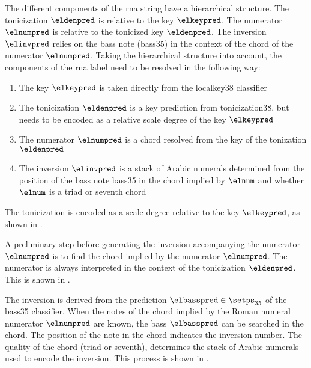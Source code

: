 
The different components of the \gls{rna} string have a
hierarchical structure. The tonicization $\eldenpred$ is
relative to the key $\elkeypred$. The numerator $\elnumpred$
is relative to the tonicized key $\eldenpred$. The inversion
$\elinvpred$ relies on the bass note (\gls{bass35}) in the
context of the chord of the numerator $\elnumpred$. Taking
the hierarchical structure into account, the components of
the \gls{rna} label need to be resolved in the following
way:

\begin{enumerate} 
    \item The key $\elkeypred$ is taken directly from the
    \gls{localkey38} classifier 
    \item The tonicization $\eldenpred$ is a key prediction
    from \gls{tonicization38}, but needs to be encoded as a
    relative scale degree of the key $\elkeypred$
    \item The numerator $\elnumpred$ is a chord resolved
    from the key of the tonization $\eldenpred$ 
    \item The inversion $\elinvpred$ is a stack of Arabic
    numerals determined from the position of the bass note
    \gls{bass35} in the chord implied by $\elnum$ and
    whether $\elnum$ is a triad or seventh chord
\end{enumerate}


The tonicization is encoded as a scale degree relative to
the key $\elkeypred$, as shown in
.



A preliminary step before generating the inversion
accompanying the numerator $\elnumpred$ is to find the chord
implied by the numerator $\elnumpred$. The numerator is
always interpreted in the context of the tonicization
$\eldenpred$. This is shown in
.


The inversion is derived from the prediction $\elbasspred
\in \setps_{35}$ of the \gls{bass35} classifier. When the
notes of the chord implied by the Roman numeral numerator
$\elnumpred$ are known, the bass $\elbasspred$ can be
searched in the chord. The position of the note in the chord
indicates the inversion number. The quality of the chord
(triad or seventh), determines the stack of Arabic numerals
used to encode the inversion. This process is shown in
.
